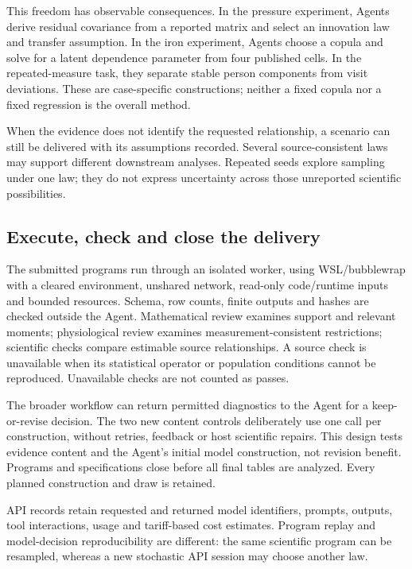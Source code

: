 \documentclass[11pt,letterpaper]{article}
\begin{document}
This freedom has observable consequences. In the pressure experiment, Agents derive residual covariance from a reported matrix and select an innovation law and transfer assumption. In the iron experiment, Agents choose a copula and solve for a latent dependence parameter from four published cells. In the repeated-measure task, they separate stable person components from visit deviations. These are case-specific constructions; neither a fixed copula nor a fixed regression is the overall method.


When the evidence does not identify the requested relationship, a scenario can still be delivered with its assumptions recorded. Several source-consistent laws may support different downstream analyses. Repeated seeds explore sampling under one law; they do not express uncertainty across those unreported scientific possibilities.


\FloatBarrier


\subsection{Execute, check and close the delivery}

The submitted programs run through an isolated worker, using WSL/\allowbreak{}bubblewrap with a cleared environment, unshared network, read-only code/\allowbreak{}runtime inputs and bounded resources. Schema, row counts, finite outputs and hashes are checked outside the Agent. Mathematical review examines support and relevant moments; physiological review examines measurement-consistent restrictions; scientific checks compare estimable source relationships. A source check is unavailable when its statistical operator or population conditions cannot be reproduced. Unavailable checks are not counted as passes.


The broader workflow can return permitted diagnostics to the Agent for a keep-or-revise decision. The two new content controls deliberately use one call per construction, without retries, feedback or host scientific repairs. This design tests evidence content and the Agent's initial model construction, not revision benefit. Programs and specifications close before all final tables are analyzed. Every planned construction and draw is retained.


API records retain requested and returned model identifiers, prompts, outputs, tool interactions, usage and tariff-based cost estimates. Program replay and model-decision reproducibility are different: the same scientific program can be resampled, whereas a new stochastic API session may choose another law.
\end{document}
